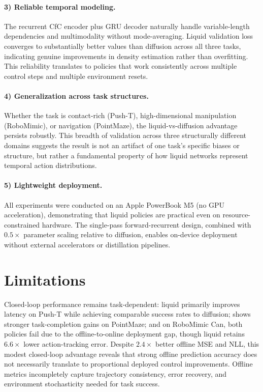 \documentclass{article}
\begin{document}
\paragraph{3) Reliable temporal modeling.}
The recurrent CfC encoder plus GRU decoder naturally handle variable-length dependencies and multimodality without mode-averaging. Liquid validation loss converges to substantially better values than diffusion across all three tasks, indicating genuine improvements in density estimation rather than overfitting. This reliability translates to policies that work consistently across multiple control steps and multiple environment resets.

\paragraph{4) Generalization across task structures.}
Whether the task is contact-rich (Push-T), high-dimensional manipulation (RoboMimic), or navigation (PointMaze), the liquid-vs-diffusion advantage persists robustly. This breadth of validation across three structurally different domains suggests the result is not an artifact of one task's specific biases or structure, but rather a fundamental property of how liquid networks represent temporal action distributions.

\paragraph{5) Lightweight deployment.}
All experiments were conducted on an Apple PowerBook M5 (no GPU acceleration), demonstrating that liquid policies are practical even on resource-constrained hardware. The single-pass forward-recurrent design, combined with $0.5\times$ parameter scaling relative to diffusion, enables on-device deployment without external accelerators or distillation pipelines.

\section{Limitations}
Closed-loop performance remains task-dependent: liquid primarily improves latency on Push-T while achieving comparable success rates to diffusion; shows stronger task-completion gains on PointMaze; and on RoboMimic Can, both policies fail due to the offline-to-online deployment gap, though liquid retains $6.6\times$ lower action-tracking error. Despite $2.4\times$ better offline MSE and NLL, this modest closed-loop advantage reveals that strong offline prediction accuracy does not necessarily translate to proportional deployed control improvements. Offline metrics incompletely capture trajectory consistency, error recovery, and environment stochasticity needed for task success.
\end{document}
